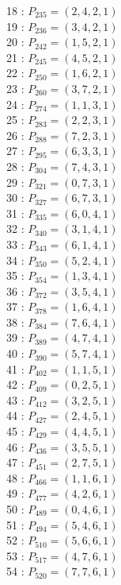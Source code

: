 \documentclass{article}
\begin{document}
{\begin{multicols}{2}
18 : $P_{235}=( 2, 4, 2, 1 )$\\
19 : $P_{236}=( 3, 4, 2, 1 )$\\
20 : $P_{242}=( 1, 5, 2, 1 )$\\
21 : $P_{245}=( 4, 5, 2, 1 )$\\
22 : $P_{250}=( 1, 6, 2, 1 )$\\
23 : $P_{260}=( 3, 7, 2, 1 )$\\
24 : $P_{274}=( 1, 1, 3, 1 )$\\
25 : $P_{283}=( 2, 2, 3, 1 )$\\
26 : $P_{288}=( 7, 2, 3, 1 )$\\
27 : $P_{295}=( 6, 3, 3, 1 )$\\
28 : $P_{304}=( 7, 4, 3, 1 )$\\
29 : $P_{321}=( 0, 7, 3, 1 )$\\
30 : $P_{327}=( 6, 7, 3, 1 )$\\
31 : $P_{335}=( 6, 0, 4, 1 )$\\
32 : $P_{340}=( 3, 1, 4, 1 )$\\
33 : $P_{343}=( 6, 1, 4, 1 )$\\
34 : $P_{350}=( 5, 2, 4, 1 )$\\
35 : $P_{354}=( 1, 3, 4, 1 )$\\
36 : $P_{372}=( 3, 5, 4, 1 )$\\
37 : $P_{378}=( 1, 6, 4, 1 )$\\
38 : $P_{384}=( 7, 6, 4, 1 )$\\
39 : $P_{389}=( 4, 7, 4, 1 )$\\
40 : $P_{390}=( 5, 7, 4, 1 )$\\
41 : $P_{402}=( 1, 1, 5, 1 )$\\
42 : $P_{409}=( 0, 2, 5, 1 )$\\
43 : $P_{412}=( 3, 2, 5, 1 )$\\
44 : $P_{427}=( 2, 4, 5, 1 )$\\
45 : $P_{429}=( 4, 4, 5, 1 )$\\
46 : $P_{436}=( 3, 5, 5, 1 )$\\
47 : $P_{451}=( 2, 7, 5, 1 )$\\
48 : $P_{466}=( 1, 1, 6, 1 )$\\
49 : $P_{477}=( 4, 2, 6, 1 )$\\
50 : $P_{489}=( 0, 4, 6, 1 )$\\
51 : $P_{494}=( 5, 4, 6, 1 )$\\
52 : $P_{510}=( 5, 6, 6, 1 )$\\
53 : $P_{517}=( 4, 7, 6, 1 )$\\
54 : $P_{520}=( 7, 7, 6, 1 )$\\

\end{multicols}}
\end{document}
